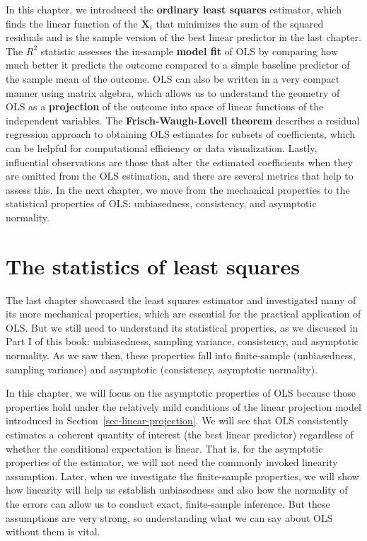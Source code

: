\documentclass[
  13pt,
  letterpaper,
  DIV=11,
  numbers=noendperiod]{scrreprt}
\newcommand{\mb}{\symbf}
\newcommand{\X}{\mb{X}}
\theoremstyle{plain}
\theoremstyle{definition}
\theoremstyle{definition}
\theoremstyle{remark}
\begin{document}
In this chapter, we introduced the \textbf{ordinary least squares}
estimator, which finds the linear function of the \(\X_i\) that
minimizes the sum of the squared residuals and is the sample version of
the best linear predictor in the last chapter. The \(R^2\) statistic
assesses the in-sample \textbf{model fit} of OLS by comparing how much
better it predicts the outcome compared to a simple baseline predictor
of the sample mean of the outcome. OLS can also be written in a very
compact manner using matrix algebra, which allows us to understand the
geometry of OLS as a \textbf{projection} of the outcome into space of
linear functions of the independent variables. The
\textbf{Frisch-Waugh-Lovell theorem} describes a residual regression
approach to obtaining OLS estimates for subsets of coefficients, which
can be helpful for computational efficiency or data visualization.
Lastly, influential observations are those that alter the estimated
coefficients when they are omitted from the OLS estimation, and there
are several metrics that help to assess this. In the next chapter, we
move from the mechanical properties to the statistical properties of
OLS: unbiasedness, consistency, and asymptotic normality.

\chapter{The statistics of least squares}\label{sec-ols-statistics}

The last chapter showcased the least squares estimator and investigated
many of its more mechanical properties, which are essential for the
practical application of OLS. But we still need to understand its
statistical properties, as we discussed in Part I of this book:
unbiasedness, sampling variance, consistency, and asymptotic normality.
As we saw then, these properties fall into finite-sample (unbiasedness,
sampling variance) and asymptotic (consistency, asymptotic normality).

In this chapter, we will focus on the asymptotic properties of OLS
because those properties hold under the relatively mild conditions of
the linear projection model introduced in
Section~\ref{sec-linear-projection}. We will see that OLS consistently
estimates a coherent quantity of interest (the best linear predictor)
regardless of whether the conditional expectation is linear. That is,
for the asymptotic properties of the estimator, we will not need the
commonly invoked linearity assumption. Later, when we investigate the
finite-sample properties, we will show how linearity will help us
establish unbiasedness and also how the normality of the errors can
allow us to conduct exact, finite-sample inference. But these
assumptions are very strong, so understanding what we can say about OLS
without them is vital.
\end{document}

